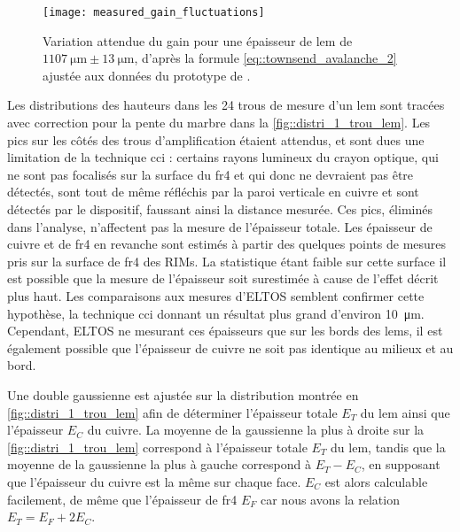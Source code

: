         \begin{figure}[!htb]
          \centering
          \texttt{[image: measured\_gain\_fluctuations]}
          \caption[Variation attendues du gain pour l'épaisseur moyennes des LEMs mesurés]{\label{fig::exp_gain_range}Variation attendue du gain pour une épaisseur de \gls{lem} de $\SI{1107}{\micro\meter}\pm\SI{13}{\micro\meter}$, d'après la formule \eqref{eq::townsend_avalanche_2} ajustée aux données du prototype de \threeL{}\cite{Cantini2014}.}
        \end{figure}
                
        Les distributions des hauteurs dans les 24 trous de mesure d'un \gls{lem} sont tracées avec correction pour la pente du marbre dans la \autoref{fig::distri_1_trou_lem}. Les pics sur les côtés des trous d'amplification étaient attendus, et sont dues une limitation de la technique \gls{cci} : certains rayons lumineux du crayon optique, qui ne sont pas focalisés sur la surface du \gls{fr4} et qui donc ne devraient pas être détectés, sont tout de même réfléchis par la paroi verticale en cuivre et sont détectés par le dispositif, faussant ainsi la distance mesurée. Ces pics, éliminés dans l'analyse, n'affectent pas la mesure de l'épaisseur totale. Les épaisseur de cuivre et de \gls{fr4} en revanche sont estimés à partir des quelques points de mesures pris sur la surface de \gls{fr4} des RIMs. La statistique étant faible sur cette surface il est possible que la mesure de l'épaisseur soit surestimée à cause de l'effet décrit plus haut. Les comparaisons aux mesures d'ELTOS semblent confirmer cette hypothèse, la technique \gls{cci} donnant un résultat plus grand d'environ \SI{10}{\micro\meter}. Cependant, ELTOS ne mesurant ces épaisseurs que sur les bords des \glspl{lem}, il est également possible que l'épaisseur de cuivre ne soit pas identique au milieux et au bord.
                
        Une double gaussienne est ajustée sur la distribution montrée en \autoref{fig::distri_1_trou_lem} afin de déterminer l'épaisseur totale $E_T$ du \gls{lem} ainsi que l'épaisseur $E_C$ du cuivre. La moyenne de la gaussienne la plus à droite sur la \autoref{fig::distri_1_trou_lem} correspond à l'épaisseur totale $E_T$ du \gls{lem}, tandis que la moyenne de la gaussienne la plus à gauche correspond à $E_T - E_C$, en supposant que l'épaisseur du cuivre est la même sur chaque face. $E_C$ est alors calculable facilement, de même que l'épaisseur de \gls{fr4} $E_F$ car nous avons la relation $E_T = E_F + 2E_C$.
                
